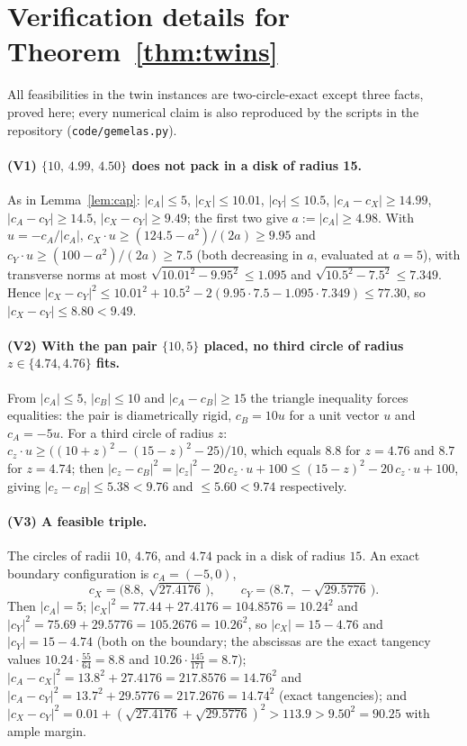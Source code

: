 \documentclass[11pt]{article}
\theoremstyle{definition}
\begin{document}
\section{Verification details for Theorem~\ref{thm:twins}}\label{app:verif}

All feasibilities in the twin instances are two-circle-exact except three
facts, proved here; every numerical claim is also reproduced by the scripts in
the repository (\texttt{code/gemelas.py}).

\paragraph{(V1) $\{10,\,4.99,\,4.50\}$ does not pack in a disk of radius 15.}
As in Lemma~\ref{lem:cap}: $|c_A|\le5$, $|c_X|\le10.01$, $|c_Y|\le10.5$,
$|c_A-c_X|\ge14.99$, $|c_A-c_Y|\ge14.5$, $|c_X-c_Y|\ge9.49$; the first two
give $a:=|c_A|\ge4.98$. With $u=-c_A/|c_A|$,
$c_X\!\cdot\!u\ge(124.5-a^2)/(2a)\ge9.95$ and
$c_Y\!\cdot\!u\ge(100-a^2)/(2a)\ge7.5$ (both decreasing in $a$, evaluated at
$a=5$), with transverse norms at most
$\sqrt{10.01^2-9.95^2}\le1.095$ and $\sqrt{10.5^2-7.5^2}\le7.349$.
Hence $|c_X-c_Y|^2\le10.01^2+10.5^2-2(9.95\cdot7.5-1.095\cdot7.349)
\le77.30$, so $|c_X-c_Y|\le8.80<9.49$.

\paragraph{(V2) With the pan pair $\{10,5\}$ placed, no third circle of radius
$z\in\{4.74,4.76\}$ fits.}
From $|c_A|\le5$, $|c_B|\le10$ and $|c_A-c_B|\ge15$ the triangle inequality
forces equalities: the pair is diametrically rigid, $c_B=10u$ for a unit
vector $u$ and $c_A=-5u$. For a third circle of radius $z$:
$c_z\!\cdot\!u\ge\bigl((10{+}z)^2-(15{-}z)^2-25\bigr)/10$, which equals $8.8$
for $z=4.76$ and $8.7$ for $z=4.74$; then
$|c_z-c_B|^2=|c_z|^2-20\,c_z\!\cdot\!u+100\le(15-z)^2-20\,c_z\!\cdot\!u+100$,
giving $|c_z-c_B|\le5.38<9.76$ and $\le5.60<9.74$ respectively.

\paragraph{(V3) A feasible triple.}
The circles of radii $10$, $4.76$, and $4.74$ pack in a disk of
radius $15$. An exact boundary configuration is $c_A=(-5,0)$,
\[
c_X=\bigl(8.8,\ \sqrt{27.4176}\,\bigr),\qquad
c_Y=\bigl(8.7,\ -\sqrt{29.5776}\,\bigr).
\]
Then $|c_A|=5$; $|c_X|^2=77.44+27.4176=104.8576=10.24^2$ and
$|c_Y|^2=75.69+29.5776=105.2676=10.26^2$, so $|c_X|=15-4.76$ and
$|c_Y|=15-4.74$ (both on the boundary; the abscissas are the exact
tangency values $10.24\cdot\tfrac{55}{64}=8.8$ and
$10.26\cdot\tfrac{145}{171}=8.7$);
$|c_A-c_X|^2=13.8^2+27.4176=217.8576=14.76^2$ and
$|c_A-c_Y|^2=13.7^2+29.5776=217.2676=14.74^2$ (exact tangencies); and
$|c_X-c_Y|^2=0.01+(\sqrt{27.4176}+\sqrt{29.5776})^2>113.9>9.50^2=90.25$
with ample margin.
\end{document}
